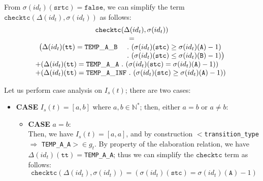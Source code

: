 \documentclass[dvipsnames,12pt]{article}
\begin{document}
\begin{niproof}
\begin{enumerate}
\begin{enumerate}
\begin{enumerate}
        From $\sigma(id_t)(\texttt{srtc})=\mathtt{false}$, we can simplify
        the term $\mathtt{checktc}(\Delta(id_t),\sigma(id_t))$ as
        follows:
        \begin{equation}
          \label{eq:eq-checktc-srtc-false}
          \begin{array}{l}
            \multicolumn{1}{c}{\mathtt{checktc}(\Delta(id_t),\sigma(id_t))}\\
            \multicolumn{1}{c}{=}\\
            \begin{array}{ll}
              \big(\Delta(id_t)(\texttt{tt})=\mathtt{TEMP\_A\_B}~&.~(\sigma(id_t)(\texttt{stc})\ge{}\sigma(id_t)(\texttt{A})-1)~\\
                                                          &.~(\sigma(id_t)(\texttt{stc})\le{}\sigma(id_t)(\texttt{B})-1)\big)\\
            \end{array}\\
            +(\Delta(id_t)(\texttt{tt})=\mathtt{TEMP\_A\_A}~.~(\sigma(id_t)(\texttt{stc})={}\sigma(id_t)(\texttt{A})-1))\\
            +(\Delta(id_t)(\texttt{tt})=\mathtt{TEMP\_A\_INF}~.~(\sigma(id_t)(\texttt{stc})\ge{}\sigma(id_t)(\texttt{A})-1)) \\
          \end{array}
        \end{equation}

        Let us perform case analysis on $I_s(t)$; there are two cases:
        \begin{itemize}
        \item \textbf{CASE} $I_s(t)=[a,b]$ where
          $a,b\in\mathbb{N}^{*}$; then, either $a=b$ or $a\neq{}b$:
          
          \begin{itemize}
          \item \textbf{CASE} $a=b$:\\
            Then, we have $I_s(t)=[a,a]$, and by construction
            ${<}$\texttt{transition\_type}$\Rightarrow{}$
            \texttt{TEMP\_A\_A}${>}\in{}g_t$. By property of the
            elaboration relation, we have
            $\Delta(id_t)$$(\texttt{tt})=$\texttt{TEMP\_A\_A}; thus we can
            simplify the $\mathtt{checktc}$ term as follows:
            \begin{equation}
              \label{eq:eq-checktc-temp-a-a}
              \mathtt{checktc}(\Delta(id_t),\sigma(id_t))=(\sigma(id_t)(\texttt{stc})={}\sigma(id_t)(\texttt{A})-1)
            \end{equation}


\end{itemize}
\end{itemize}
\end{enumerate}
\end{enumerate}
\end{enumerate}
\end{niproof}
\end{document}
